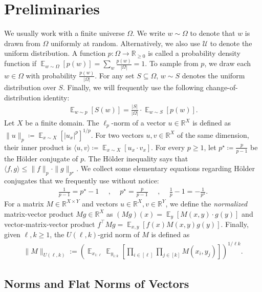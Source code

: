 \documentclass[11pt]{article}
\DeclareMathOperator*{\E}{\mathbb{E}}
\newcommand{\1}{ \mathbbm{1}}
\begin{document}
\section{Preliminaries}\label{sec: preliminary}

We usually work with a finite universe $\Omega$. We write $w\sim \Omega$ to denote that $w$ is drawn from $\Omega$ uniformly at random. Alternatively, we also use $\mathcal{U}$ to denote the uniform distribution. A function $p:\Omega\to \mathbb{R}_{\ge 0}$ is called a probability density function if $\E_{w\sim \Omega}[p(w)] = \sum_{w} \frac{p(w)}{|\Omega|} = 1$. To sample from $p$, we draw each $w\in \Omega$ with probability $\frac{p(w)}{|\Omega|}$. For any set $S\subseteq \Omega$, $w\sim S$ denotes the uniform distribution over $S$. Finally, we will frequently use the following change-of-distribution identity:
\begin{align}
 \E_{w\sim p}[S(w)] = \frac{|S|}{|\Omega|} \cdot \E_{w\sim S}[p(w)]. \label{equ:change-of-dist}
\end{align}
Let $X$ be a finite domain. The $\ell_p$-norm of a vector $u\in \mathbb{R}^X$ is defined as $\|u\|_{p} \coloneqq \E_{x\sim X}[|u_x|^p]^{1/p}$. For two vectors $u,v\in \mathbb{R}^X$ of the same dimension, their inner product is $\langle u, v\rangle \coloneqq \E_{x\sim X} [u_x \cdot v_x]$. For every $p\ge 1$, let $p^\star \coloneqq \frac{p}{p-1}$ be the H\"older conjugate of $p$. The H\"older inequality says that $\langle f, g\rangle \le \| f\|_p \cdot \|g \|_{p^\star}$. We collect some elementary equations regarding H\"older conjugates that we frequently use without notice:
\begin{align}
\frac{1}{p-1} = p^\star - 1 \text{~~~~,~~~~} p^\star = \frac{p}{p-1} \text{~~~~,~~~~}  \frac{1}{p} - 1 = -\frac{1}{p^\star}.
\end{align}
For a matrix $M\in \mathbb{R}^{X\times Y}$ and vectors $u\in \mathbb{R}^X, v\in \mathbb{R}^Y$, we define the \emph{normalized} matrix-vector product $Mg\in \mathbb{R}^{X}$ as $(Mg)(x) = \E_{y}[M(x,y)\cdot g(y)]$ and vector-matrix-vector product $f^\top M g = \E_{x,y}[f(x) M(x,y) g(y)]$. Finally, given $\ell, k\ge 1$, the $U(\ell, k)$-grid norm of $M$ is defined as
\begin{align}
    \|M\|_{U(\ell, k)} := \left( \E_{x_{1:\ell}} \E_{y_{1:k}} \left[ \prod_{i\in [\ell]}\prod_{j\in [k]} M(x_i, y_j) \right] \right)^{1/\ell k}. \label{equ: defn grid norm}
\end{align}

\subsection{Norms and Flat Norms of Vectors}
\end{document}
